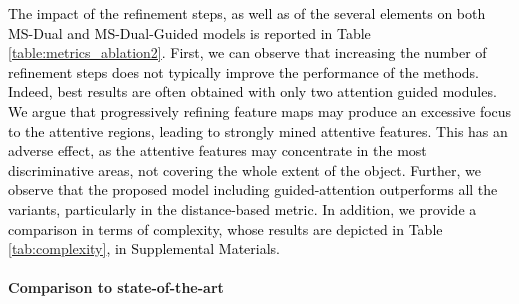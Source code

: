 \documentclass[journal]{IEEEtran}
\begin{document}
\textcolor{black}{The impact of the refinement steps, as well as of the several elements on both MS-Dual and MS-Dual-Guided models is reported in Table \ref{table:metrics_ablation2}. First, we can observe that increasing the number of refinement steps does not typically improve the performance of the methods. Indeed, best results are often obtained with only two attention guided modules. We argue that progressively refining feature maps may produce an excessive focus to the attentive regions, leading to strongly mined attentive features. This has an adverse effect, as the attentive features may concentrate in the most discriminative areas, not covering the whole extent of the object. Further, we observe that the proposed model including guided-attention outperforms all the variants, particularly in the distance-based metric. In addition, we provide a comparison in terms of complexity, whose results are depicted in Table \ref{tab:complexity}, in Supplemental Materials.}



\paragraph*{\textbf{Comparison to state-of-the-art}}
\end{document}
